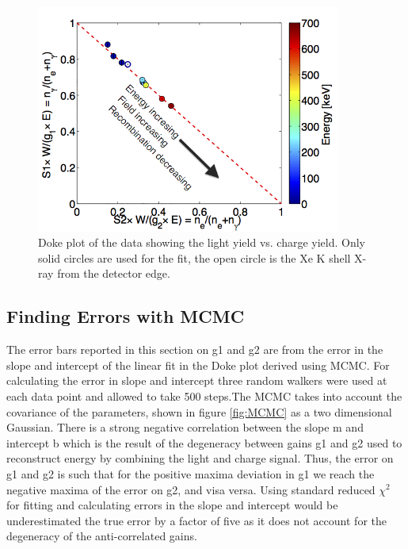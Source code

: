  \begin{figure}[h!]\centering
\includegraphics[width=100mm]{Recombination_LY_QY/Figures/S1S2_Doke2_3_arrow.png}
\caption{Doke plot of the data showing the light yield vs. charge yield. Only solid circles are used for the fit, the open circle is the Xe K shell X-ray from the detector edge.}
\label{fig:Doke_E}
\end{figure}

\newpage

\subsection{Finding Errors with MCMC}
\label{sec:MCMC}
The error bars reported in this section on g1 and g2 are from the error in the slope and intercept of the linear fit in the Doke plot derived using MCMC. For calculating the error in slope and intercept  three random walkers were used at each data point and allowed to take 500 steps.The MCMC takes into account the covariance of the parameters, shown in figure \ref{fig:MCMC} as a two dimensional Gaussian. There is a strong negative correlation between the slope m and intercept b which is the result of the degeneracy between gains g1 and g2 used to reconstruct energy by combining the light and charge signal. Thus, the error on g1 and g2 is such that for the positive maxima deviation in g1 we reach the negative maxima of the error on g2, and visa versa. Using standard reduced $\chi^2$ for fitting and calculating errors in the slope and intercept would be underestimated the true error by a factor of five as it does not account for the degeneracy of the anti-correlated gains. 



